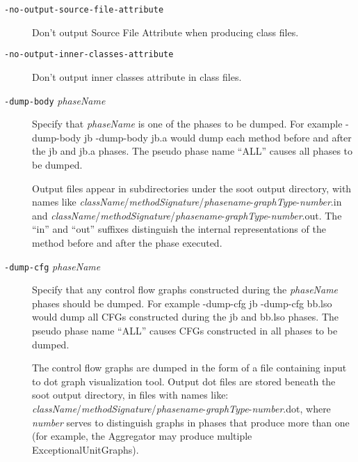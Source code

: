 \documentclass{article}
\begin{document}
\begin{description}
  \item[
  {\tt -no-output-source-file-attribute}]

Don't output Source File Attribute when producing class files.



  \item[
  {\tt -no-output-inner-classes-attribute}]

            Don't output inner classes attribute in class files.



  \item[
  {\tt -dump-body}{ \it phaseName}]


\par

Specify that {\it phaseName} is one of the phases to be dumped.
For example -dump-body jb -dump-body jb.a would dump each
method before and after the jb and jb.a
phases.  The pseudo phase name ``ALL''
causes all phases to be dumped.

\par

Output files appear in subdirectories under the
soot output directory, with names like
{\it className}/{\it methodSignature}/{\it phasename}-{\it graphType}-{\it number}.in
and
{\it className}/{\it methodSignature}/{\it phasename}-{\it graphType}-{\it number}.out.
The ``in'' and
``out'' suffixes distinguish the internal
representations of the method before and after the phase
executed.



  \item[
  {\tt -dump-cfg}{ \it phaseName}]


\par

Specify that any control flow graphs constructed during the
{\it phaseName} phases should be dumped.
For example -dump-cfg jb -dump-cfg bb.lso would dump
all
CFGs constructed during the jb and bb.lso
phases.  The pseudo phase name ``ALL''
causes CFGs constructed in all phases to be dumped.

\par
The control flow graphs are dumped in the form
of a file containing input to dot graph visualization
tool.  Output dot files are stored beneath the soot
output directory, in files with names like:
{\it className}/{\it methodSignature}/{\it phasename}-{\it graphType}-{\it number}.dot,
where {\it number} serves to distinguish graphs in phases
that produce more than one (for example, the Aggregator may
produce multiple ExceptionalUnitGraphs).




\end{description}
\end{document}
